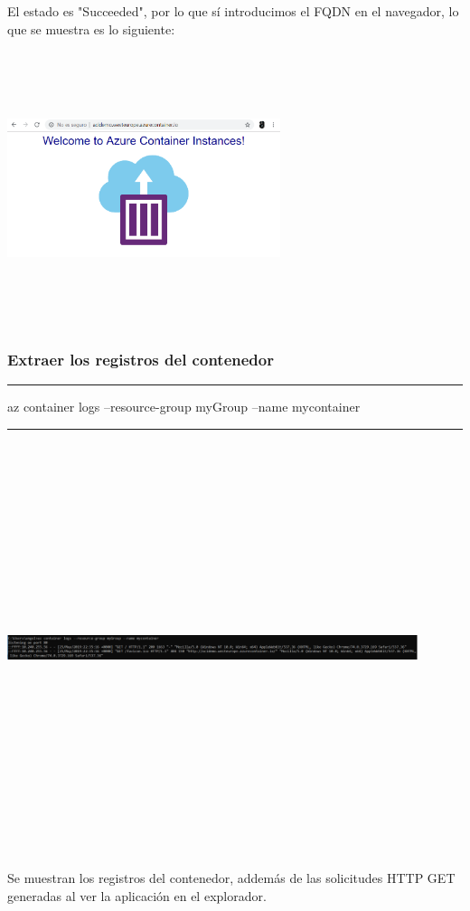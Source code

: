 \documentclass[english,runningheads,a4paper]{llncs}[2018/03/10]
\newenvironment{nscenter}
 {\parskip=0pt\par\nopagebreak\centering}
 {\par\noindent\ignorespacesafterend}
\begin{document}
El estado es "Succeeded", por lo que sí introducimos el FQDN en el navegador, 
lo que se muestra es lo siguiente:
\newline
\begin{nscenter}
\includegraphics[width=8cm,height=8cm,keepaspectratio]{./Contenedores/Azure/7.png}
\end{nscenter}

\subsubsection*{Extraer los registros del contenedor}

\begin{nscenter}
\noindent\rule{10cm}{0.4pt}

az container logs --resource-group myGroup --name mycontainer

\noindent\rule{10cm}{0.4pt}
\end{nscenter}
\newline
\begin{nscenter}
\includegraphics[width=12cm,height=12cm,keepaspectratio]{./Contenedores/Azure/8.png}
\end{nscenter}
\newline
Se muestran los registros del contenedor, addemás de las solicitudes HTTP GET 
generadas al ver la aplicación en el explorador.
\newpage
\end{document}
